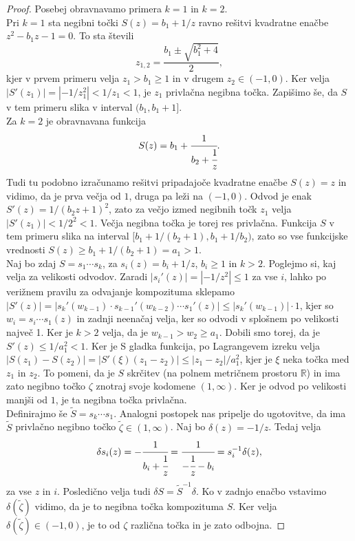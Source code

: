 \documentclass[a4paper,12pt]{article}
\def\R{\mathbb{R}} %
\newenvironment{dokaz}[1][Dokaz]{\begin{proof}}{\end{proof}}
\begin{document}
\begin{dokaz}
    Posebej obravnavamo primera $k = 1$ in $k = 2$.\\
    Pri $k = 1$ sta negibni točki $S(z) = b_1 + 1 / z$ ravno rešitvi kvadratne enačbe $z^2 - b_1z - 1 = 0$. To sta števili 
    \[
        z_{1, 2} = \frac{b_1 \pm \sqrt{b_1^2+4}}{2},
    \]
    kjer v prvem primeru velja $z_1 > b_1 \geq 1$ in v drugem $z_2 \in (-1, 0)$. Ker velja $|S'(z_1)| = |-1/z_1^2| < 1/z_1 < 1$, je $z_1$ privlačna negibna točka. Zapišimo še, da $S$ v tem primeru slika v interval $(b_1, b_1 + 1]$. \\
    Za $k = 2$ je obravnavana funkcija
    \[
        S(z) = b_1 + \cfrac{1}{b_2 + \cfrac{1}{z}}.
    \]
    Tudi tu podobno izračunamo rešitvi pripadajoče kvadratne enačbe $S(z) = z$ in vidimo, da je prva večja od $1$, druga pa leži na $(-1, 0)$. Odvod je enak $S'(z) = 1 / (b_2z + 1)^2$, zato za večjo izmed negibnih točk $z_1$ velja $|S'(z_1)| < 1 / 2^2 < 1$. Večja negibna točka je torej res privlačna. Funkcija $S$ v tem primeru slika na interval $[b_1 + 1/(b_2 + 1), b_1 + 1/b_2)$, zato so vse funkcijske vrednosti $S(z) \geq b_1 + 1/(b_2 + 1) = a_1 > 1$. \\
    Naj bo zdaj $S = s_1 \cdots s_k$, za $s_i(z) = b_i + 1/z$, $b_i \geq 1$ in $k > 2$. Poglejmo si, kaj velja za velikosti odvodov. Zaradi $|s_i'(z)| = |-1 / z^2| \leq 1$ za vse $i$, lahko po verižnem pravilu za odvajanje kompozituma sklepamo $|S'(z)| = |s_k'(w_{k-1})\cdot s_{k-1}'(w_{k-2})\cdots s_1'(z)| \leq |s_k'(w_{k-1})| \cdot 1$, kjer so $w_i = s_i\cdots s_1(z)$ in zadnji neenačaj velja, ker so odvodi v splošnem po velikosti največ 1. Ker je $k > 2$ velja, da je $w_{k-1} > w_2 \geq a_1$. Dobili smo torej, da je $S'(z) \leq 1/a_1^2 < 1$. Ker je S gladka funkcija, po Lagrangevem izreku velja $|S(z_1) - S(z_2)| = |S'(\xi)(z_1 - z_2)| \leq |z_1 - z_2| / a_1^2$, kjer je $\xi$ neka točka med $z_1$ in $z_2$. To pomeni, da je $S$ skrčitev (na polnem metričnem prostoru $\R$) in ima zato negibno točko $\zeta$ znotraj svoje kodomene $(1, \infty)$. Ker je odvod po velikosti manjši od $1$, je ta negibna točka privlačna. \\
    Definirajmo še $\tilde{S} = s_k \cdots s_1$. Analogni postopek nas pripelje do ugotovitve, da ima $\tilde{S}$ privlačno negibno točko $\tilde{\zeta} \in (1, \infty)$. Naj bo $\delta(z) = -1/z$. Tedaj velja
    \[
        \delta s_i (z) = - \cfrac{1}{b_i + \cfrac{1}{z}} = \cfrac{1}{-\cfrac{1}{z} - b_i} = s^{-1}_i \delta (z),
    \]
    za vse $z$ in $i$. Posledično velja tudi $\delta S = \tilde{S}^{-1} \delta$. Ko v zadnjo enačbo vstavimo $\delta (\tilde{\zeta})$ vidimo, da je to negibna točka kompozituma $S$. Ker velja $\delta (\tilde{\zeta}) \in (-1, 0)$, je to od $\zeta$ različna točka in je zato odbojna.
\end{dokaz}
\end{document}
